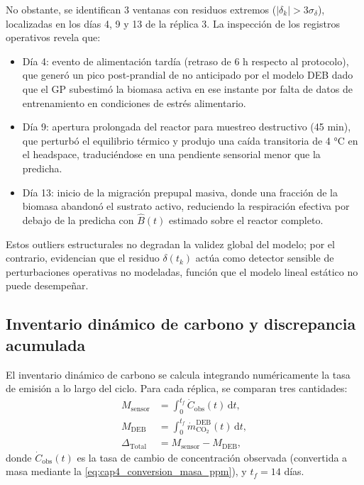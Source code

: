 No obstante, se identifican \num{3} ventanas con residuos extremos ($|\delta_k| > \num{3}\sigma_{\delta}$), localizadas en los días \num{4}, \num{9} y \num{13} de la réplica \num{3}. La inspección de los registros operativos revela que:
\begin{itemize}
    \item Día \num{4}: evento de alimentación tardía (retraso de \num{6} h respecto al protocolo), que generó un pico post-prandial de  no anticipado por el modelo DEB dado que el GP subestimó la biomasa activa en ese instante por falta de datos de entrenamiento en condiciones de estrés alimentario.
    \item Día \num{9}: apertura prolongada del reactor para muestreo destructivo (\num{45} min), que perturbó el equilibrio térmico y produjo una caída transitoria de \num{4} °C en el headspace, traduciéndose en una pendiente sensorial menor que la predicha.
    \item Día \num{13}: inicio de la migración prepupal masiva, donde una fracción de la biomasa abandonó el sustrato activo, reduciendo la respiración efectiva por debajo de la predicha con $\hat{B}(t)$ estimado sobre el reactor completo.
\end{itemize}

Estos outliers estructurales no degradan la validez global del modelo; por el contrario, evidencian que el residuo $\delta(t_k)$ actúa como detector sensible de perturbaciones operativas no modeladas, función que el modelo lineal estático no puede desempeñar.

\subsection{Inventario dinámico de carbono y discrepancia acumulada}
\label{subsec:cap4_inventario_carbono}

El inventario dinámico de carbono se calcula integrando numéricamente la tasa de emisión a lo largo del ciclo. Para cada réplica, se comparan tres cantidades:
\begin{align}
    \label{eq:cap4_masa_sensor}
    M_{\mathrm{sensor}} &= \int_{0}^{t_f}\dot{C}_{\mathrm{obs}}(t)\,\mathrm{d}t, \\
    \label{eq:cap4_masa_deb}
    M_{\mathrm{DEB}} &= \int_{0}^{t_f}\dot{m}_{\mathrm{CO_2}}^{\mathrm{DEB}}(t)\,\mathrm{d}t, \\
    \label{eq:cap4_discrepancia}
    \Delta_{\mathrm{Total}} &= M_{\mathrm{sensor}} - M_{\mathrm{DEB}},
\end{align}
donde $\dot{C}_{\mathrm{obs}}(t)$ es la tasa de cambio de concentración observada (convertida a masa mediante la \cref{eq:cap4_conversion_masa_ppm}), y $t_f = \num{14}$ días.

